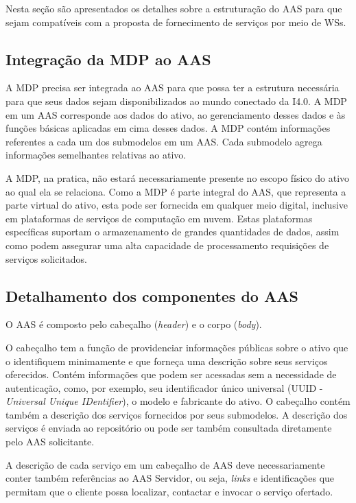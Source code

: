 	Nesta seção são apresentados os detalhes sobre a estruturação do AAS para que sejam compatíveis com a proposta de fornecimento de serviços por meio de WSs.
	
\subsection{Integração da MDP ao AAS}

	A MDP precisa ser integrada ao AAS para que possa ter a estrutura necessária para que seus dados sejam disponibilizados ao mundo conectado da I4.0. A MDP em um AAS corresponde aos dados do ativo, ao gerenciamento desses dados e às funções básicas aplicadas em cima desses dados. A MDP contém informações referentes a cada um dos submodelos em um AAS. Cada submodelo agrega informações semelhantes relativas ao ativo. 
	
	A MDP, na pratica, não estará necessariamente presente no escopo físico do ativo ao qual ela se relaciona. Como a MDP é parte integral do AAS, que representa a parte virtual do ativo, esta pode ser fornecida em qualquer meio digital, inclusive em plataformas de serviços de computação em nuvem. Estas plataformas específicas suportam o armazenamento de grandes quantidades de dados, assim como podem assegurar uma alta capacidade de processamento requisições de serviços solicitados.
	
\subsection{ Detalhamento dos componentes do AAS }

	O AAS é composto pelo cabeçalho (\textit{header}) e o corpo (\textit{body}).
	
	O cabeçalho tem a função de providenciar informações públicas sobre o ativo que o identifiquem minimamente e que forneça uma descrição sobre seus serviços oferecidos. Contém informações que podem ser acessadas sem a necessidade de autenticação, como, por exemplo, seu identificador único universal (UUID - \textit{Universal Unique IDentifier}), o modelo e fabricante do ativo. O cabeçalho contém também a descrição dos serviços fornecidos por seus submodelos. A descrição dos serviços é enviada ao repositório ou pode ser também consultada diretamente pelo AAS solicitante.
	
	A descrição de cada serviço em um cabeçalho de AAS deve necessariamente conter também referências ao AAS Servidor, ou seja, \textit{links} e identificações que permitam que o cliente possa localizar, contactar e invocar o serviço ofertado.
	
